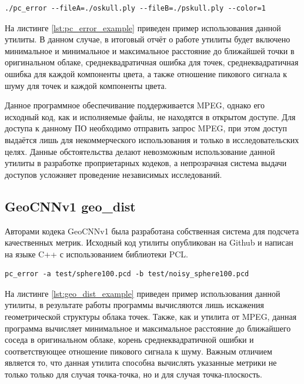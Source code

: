 \begin{lstlisting}[caption={
    Пример использования утилиты mpeg-pcc-dmetric, параметр fileA -
    оригинальное облако, fileB - реконструированное облако, color=1 - также
    вычисляются значения искажения цветов.
}, label={lst:pc_error_example}]
./pc_error --fileA=./oskull.ply --fileB=./pskull.ply --color=1
\end{lstlisting}

На листинге \ref{lst:pc_error_example} приведен пример использования данной
утилиты. В данном случае, в итоговый отчёт о работе утилиты будет включено
минимальное и минимальное и максимальное расстояние до ближайшей точки в
оригинальном облаке, среднеквадратичная ошибка для точек, среднеквадратичная
ошибка для каждой компоненты цвета, а также отношение пикового сигнала к шуму
для точек и каждой компоненты цвета.

Данное программное обеспечивание поддерживается MPEG, однако его исходный код,
как и исполняемые файлы, не находятся в открытом доступе. Для доступа к данному
ПО необходимо отправить запрос MPEG, при этом доступ выдаётся лишь для
некоммерческого использования и только в исследовательских целях. Данные
обстоятельства делают невозможным использование данной утилиты в разработке
проприетарных кодеков, а непрозрачная система выдачи доступов усложняет
проведение независимых исследований.

\subsection{GeoCNNv1 geo\_dist}

Авторами кодека GeoCNNv1\cite{GeoCNNv1} была разработана собственная система для
подсчета качественных метрик. Исходный код утилиты опубликован на
Github\cite{GeoDistGithub} и написан на языке C++ с использованием библиотеки
PCL.

\begin{lstlisting}[caption={
    Пример использования утилиты geo\_dist, параметр a - оригинальное облако, b
    - реконструированное облако.
}, label={lst:geo_dist_example}]
pc_error -a test/sphere100.pcd -b test/noisy_sphere100.pcd
\end{lstlisting}

На листинге \ref{lst:geo_dist_example} приведен пример использования данной
утилиты, в результате работы программы вычисляются лишь искажения геометрической
структуры облака точек. Также, как и утилита от MPEG, данная программа вычисляет
минимальное и максимальное расстояние до ближайшего соседа в оригинальном
облаке, корень среднеквадратичной ошибки и соответствующее отношение пикового
сигнала к шуму. Важным отличием является то, что данная утилита способна
вычислять указанные метрики не только только для случая точка-точка, но и для
случая точка-плоскость.

